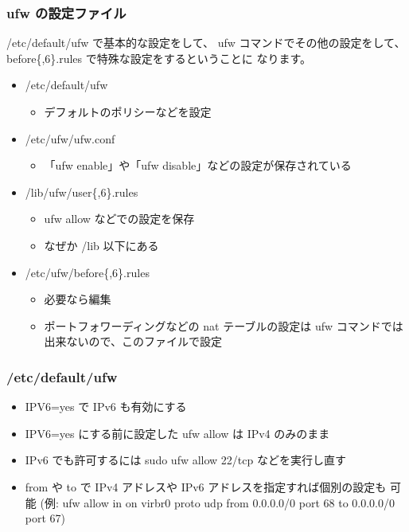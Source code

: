 \documentclass[mingoth,a4paper]{jsarticle}
\begin{document}
\subsubsection{ufw の設定ファイル}

/etc/default/ufw で基本的な設定をして、
ufw コマンドでその他の設定をして、
before\{,6\}.rules で特殊な設定をするということに
なります。

\begin{itemize}
\item /etc/default/ufw

\begin{itemize}
\item デフォルトのポリシーなどを設定
\end{itemize}

\item /etc/ufw/ufw.conf

\begin{itemize}
\item 「ufw enable」や「ufw disable」などの設定が保存されている
\end{itemize}

\item /lib/ufw/user\{,6\}.rules

\begin{itemize}
\item ufw allow などでの設定を保存
\item なぜか /lib 以下にある
\end{itemize}

\item /etc/ufw/before\{,6\}.rules

\begin{itemize}
\item 必要なら編集
\item ポートフォワーディングなどの nat テーブルの設定は
    ufw コマンドでは出来ないので、このファイルで設定
\end{itemize}

\end{itemize}
\subsubsection{/etc/default/ufw}

\begin{itemize}
\item IPV6=yes で IPv6 も有効にする
\item IPV6=yes にする前に設定した ufw allow は IPv4 のみのまま
\item IPv6 でも許可するには sudo ufw allow 22/tcp などを実行し直す
\item from や to で IPv4 アドレスや IPv6 アドレスを指定すれば個別の設定も
  可能 (例: ufw allow in on virbr0 proto udp from 0.0.0.0/0 port 68 to
  0.0.0.0/0 port 67)
\end{itemize}
\end{document}
